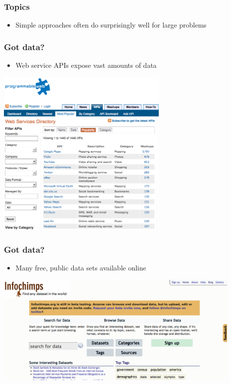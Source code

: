 \begin{frame}
  \frametitle{Topics}

  \begin{itemize}
    \item Simple approaches often do surprisingly well for large problems
  \end{itemize}

\end{frame}

\begin{frame}
  \frametitle{Got data?}

  \begin{itemize}
    \item Web service APIs expose vast amounts of data
  \end{itemize}

    \begin{center}
      \includegraphics[width=0.625\textwidth]{programmableweb.png}
    \end{center}

\end{frame}

\begin{frame}
  \frametitle{Got data?}

  \begin{itemize}
    \item Many free, public data sets available online
  \end{itemize}

    \begin{center}
      \includegraphics[width=0.9\textwidth]{infochimps.png}
    \end{center}

\end{frame}


